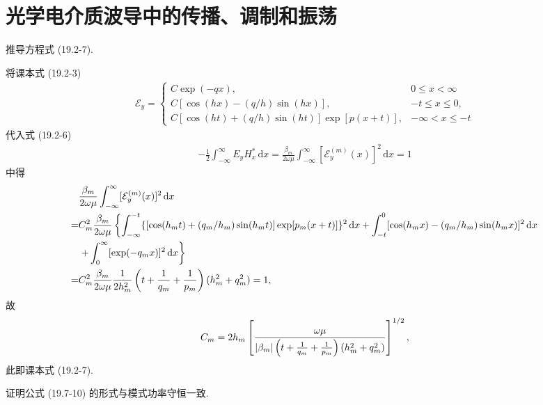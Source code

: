 \documentclass{note}
\begin{document}
\fi
\setcounter{chapter}{14}
\chapter{光学电介质波导中的传播、调制和振荡}
\begin{exe}
    推导方程式 (19.2-7).
\end{exe}
\begin{pf}
    将课本式 (19.2-3)
    \begin{align}
        \mathcal{E}_y=\left\{\begin{array}{ll}
            C\exp(-qx),&0\leq x<\infty\\
            C[\cos(hx)-(q/h)\sin(hx)],&-t\leq x\leq 0,\\
            C[\cos(ht)+(q/h)\sin(ht)]\exp[p(x+t)],&-\infty<x\leq-t
        \end{array}\right.
    \end{align}
    代入式 (19.2-6)
    \begin{align}
        -\frac{1}{2}\int_{-\infty}^{\infty}E_yH_x^*\,\mathrm{d}x=\frac{\beta_m}{2\omega\mu}\int_{-\infty}^{\infty}[\mathcal{E}_y^{(m)}(x)]^2\,\mathrm{d}x=1
    \end{align}
    中得
    \begin{align}
        \notag&\frac{\beta_m}{2\omega\mu}\int_{-\infty}^{\infty}[\mathcal{E}_y^{(m)}(x)]^2\,\mathrm{d}x\\
        \notag=&C_m^2\frac{\beta_m}{2\omega\mu}\left\{\int_{-\infty}^{-t}\{[\cos(h_mt)+(q_m/h_m)\sin(h_mt)]\exp[p_m(x+t)]\}^2\,\mathrm{d}x+\int_{-t}^0[\cos(h_mx)-(q_m/h_m)\sin(h_mx)]^2\,\mathrm{d}x\right.\\
        \notag&\left.+\int_0^{\infty}[\exp(-q_mx)]^2\,\mathrm{d}x\right\}\\
        \notag=&C_m^2\frac{\beta_m}{2\omega\mu}\frac{1}{2h_m^2}\left(t+\frac{1}{q_m}+\frac{1}{p_m}\right)(h_m^2+q_m^2)=1,
    \end{align}
    故
    \begin{align}
        C_m=2h_m\left[\frac{\omega\mu}{\left\lvert\beta_m\right\rvert\left(t+\frac{1}{q_m}+\frac{1}{p_m}\right)(h_m^2+q_m^2)}\right]^{1/2},
    \end{align}
    此即课本式 (19.2-7).
\end{pf}

\begin{exe}
    证明公式 (19.7-10) 的形式与模式功率守恒一致.
\end{exe}
\begin{pf}
    
\end{pf}
\end{document}
